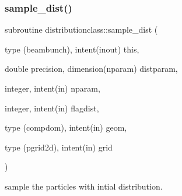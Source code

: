 \subsubsection{\texorpdfstring{sample\_dist()}{sample\_dist()}}
{\footnotesize\ttfamily subroutine distributionclass\+::sample\+\_\+dist (\begin{DoxyParamCaption}\item[{type (beambunch), intent(inout)}]{this,  }\item[{double precision, dimension(nparam)}]{distparam,  }\item[{integer, intent(in)}]{nparam,  }\item[{integer, intent(in)}]{flagdist,  }\item[{type (compdom), intent(in)}]{geom,  }\item[{type (pgrid2d), intent(in)}]{grid }\end{DoxyParamCaption})}



sample the particles with intial distribution. 

